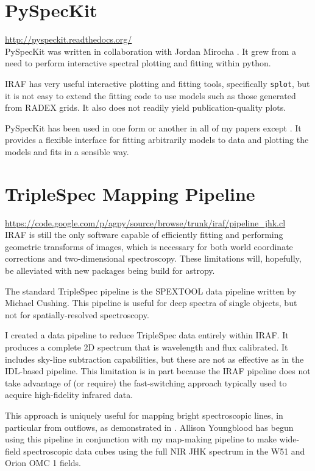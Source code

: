\section{PySpecKit}
\url{http://pyspeckit.readthedocs.org/} \\
PySpecKit was written in collaboration with Jordan Mirocha \citep{Ginsburg2011c}.
It grew from a need to perform interactive spectral plotting and fitting within python.

IRAF has very useful interactive plotting and fitting tools, specifically
\texttt{splot}, but it is not easy to extend the fitting code to use models
such as those generated from RADEX grids.  It also does not readily yield
publication-quality plots.

PySpecKit has been used in one form or another in all of my papers except
\citet{Ginsburg2012a}.  It provides a flexible interface for fitting
arbitrarily models to data and plotting the models and fits in a sensible way.

\section{TripleSpec Mapping Pipeline}
\url{https://code.google.com/p/agpy/source/browse/trunk/iraf/pipeline_jhk.cl} \\
IRAF is still the only software capable of efficiently fitting and performing
geometric transforms of images, which is necessary for both world coordinate
corrections and two-dimensional spectroscopy.  These limitations will, hopefully,
be alleviated with new packages being build for astropy.

The standard TripleSpec pipeline is the SPEXTOOL data pipeline written by Michael
Cushing.  This pipeline is useful for deep spectra of single objects, but not
for spatially-resolved spectroscopy.

I created a data pipeline to reduce TripleSpec data entirely within IRAF.  It
produces a complete 2D spectrum that is wavelength and flux calibrated.  It
includes sky-line subtraction capabilities, but these are not as effective as
in the IDL-based pipeline.  This limitation is in part because the IRAF
pipeline does not take advantage of (or require) the fast-switching approach
typically used to acquire high-fidelity infrared data.

This approach is uniquely useful for mapping bright spectroscopic lines, in
particular from outflows, as demonstrated in \citet{Ginsburg2009}.  Allison
Youngblood has begun using this pipeline in conjunction with my map-making
pipeline to make wide-field spectroscopic data cubes using the full NIR JHK
spectrum in the W51 and Orion OMC 1 fields.

